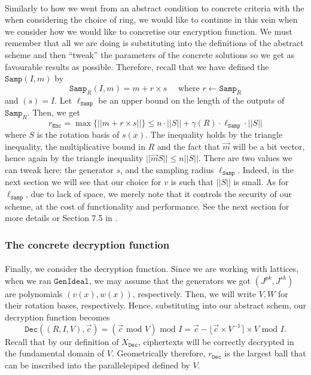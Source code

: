 \documentclass{article}
\theoremstyle{definition}
\theoremstyle{example}
\newcommand{\Enc}{\texttt{Enc}}
\newcommand{\Dec}{\texttt{Dec}}
\renewcommand{\mod}{\,\,\text{mod}\,\,}
\newcommand{\GenIdeal}{\texttt{GenIdeal}}
\newcommand{\Samp}{\texttt{Samp}}
\newcommand{\norm}[1]{||#1||}
\begin{document}
\paragraph{} Similarly to how we went from an abstract condition to concrete
criteria with the when considering the choice of ring, we would like to continue
in this vein when we consider how we would like to concretise our encryption
function. We must remember that all we are doing is substituting into the
definitions of the abstract scheme and then ``tweak'' the parameters of the
concrete solutions so we get as favourable results as possible. Therefore,
recall that we have defined the $\Samp(I, m)$ by
\[
  \Samp_R(I, m) = m + r \times s\quad \text{ where } r \leftarrow \Samp_R
\]
and $(s) = I$. Let $\ell_\Samp$ be an upper bound on the length of the outputs
of $\Samp_R$. Then, we get
\[
  r_\Enc = \max\{\norm{m + r \times s}\} \leq n \cdot \norm{S} + \gamma(R)\cdot\ell_{\Samp}\cdot\norm{S}
\]
where $S$ is the rotation basis of $s(x)$. The inequality holds by the
triangle inequality, the multiplicative bound in $R$ and the fact that
$\vec{m}$ will be a bit vector, hence again by the triangle inequality
$\norm{\vec{m}S}\leq n\norm{S}$. There are two values we
can tweak here: the generator $s$, and the sampling radius $\ell_\Samp$. Indeed,
in the next section we will see that our choice for $v$ is such that $\norm{S}$
is small. As for $\ell_\Samp$, due to lack of space, we merely note that it
controls the security of our scheme, at the cost of functionality and
performance. See the next section for more details or Section 7.5 in \cite{gentry2009fully}.
\subsubsection{The concrete decryption function}
\paragraph{} Finally, we consider the decryption function. Since we are working
with lattices, when we ran $\GenIdeal$, we may assume that the generators we got
$(J^{pk}, J^{sk})$ are polynomials $(v(x), w(x))$, respectively. Then, we will
write $V, W$ for their rotation bases, respectively. Hence, substituting into
our abstract schem, our decryption function becomes
\[
  \Dec((R, I, V), \vec{c}) = (\vec{c} \mod V) \mod I = \vec{c} - \lfloor \vec{c}
  \times V^{-1} \rceil \times V \mod I.
\]
Recall that by our definition of $X_\Dec$, ciphertexts will be correctly
decrypted in the fundamental domain of $V$. Geometrically therefore, $r_\Dec$ is the largest ball
that can be inscribed into the parallelepiped defined by $V$.
\end{document}
